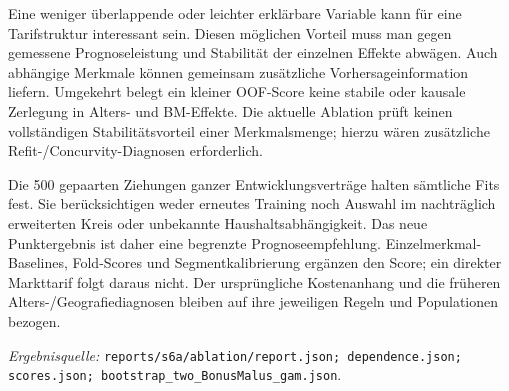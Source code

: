 \documentclass[11pt,a4paper]{article}
\newcommand{\evidence}[1]{\par{\footnotesize\textit{Ergebnisquelle:} \nolinkurl{#1}.}\par}
\begin{document}
Eine weniger überlappende oder leichter erklärbare Variable kann für eine Tarifstruktur interessant sein. Diesen möglichen Vorteil muss man gegen gemessene Prognoseleistung und Stabilität der einzelnen Effekte abwägen. Auch abhängige Merkmale können gemeinsam zusätzliche Vorhersageinformation liefern. Umgekehrt belegt ein kleiner OOF-Score keine stabile oder kausale Zerlegung in Alters- und BM-Effekte. Die aktuelle Ablation prüft keinen vollständigen Stabilitätsvorteil einer Merkmalsmenge; hierzu wären zusätzliche Refit-/Concurvity-Diagnosen erforderlich.

Die 500 gepaarten Ziehungen ganzer Entwicklungsverträge halten sämtliche Fits fest. Sie berücksichtigen weder erneutes Training noch Auswahl im nachträglich erweiterten Kreis oder unbekannte Haushaltsabhängigkeit. Das neue Punktergebnis ist daher eine begrenzte Prognoseempfehlung. Einzelmerkmal-Baselines, Fold-Scores und Segmentkalibrierung ergänzen den Score; ein direkter Markttarif folgt daraus nicht. Der ursprüngliche Kostenanhang und die früheren Alters-/Geografiediagnosen bleiben auf ihre jeweiligen Regeln und Populationen bezogen.
\evidence{reports/s6a/ablation/report.json; dependence.json; scores.json; bootstrap_two_BonusMalus_gam.json}
\end{document}
